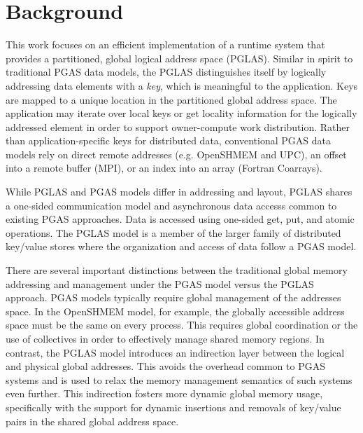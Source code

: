\section{Background}

This work focuses on an efficient implementation of a runtime system that
provides a partitioned, global logical address space (PGLAS). Similar in spirit
to traditional PGAS data models, the PGLAS distinguishes itself by logically
addressing data elements with a {\em key}, which is meaningful to the
application. Keys are mapped to a unique location in the partitioned global
address space. The application may iterate over local keys or get locality
information for the logically addressed element in order to support
owner-compute work distribution. Rather than application-specific keys for distributed
data, conventional PGAS data models rely on direct remote addresses (e.g. OpenSHMEM
and UPC), an offset into a remote buffer (MPI), or an index into an array
(Fortran Coarrays). 

While PGLAS and PGAS models differ in addressing and layout, PGLAS shares a
one-sided communication model and asynchronous data accesss common to existing
PGAS approaches. Data is accessed using one-sided get, put, and atomic operations.
The PGLAS model is a member of the larger family of distributed key/value stores where
the organization and access of data follow a PGAS model.


There are several important distinctions between the traditional global memory
addressing and management under the PGAS model versus the PGLAS approach. PGAS
models typically require global management of the addresses space. In the
OpenSHMEM model, for example, the globally accessible address space must be the
same on every process. This requires global coordination or the use of
collectives in order to effectively manage shared memory regions. In contrast,
the PGLAS model introduces an indirection layer between the logical and
physical global addresses. This avoids the overhead common to PGAS systems and
is used to relax the memory management semantics of such systems even further.
This indirection fosters more dynamic global memory usage, specifically with
the support for dynamic insertions and removals of key/value pairs in the
shared global address space. 

